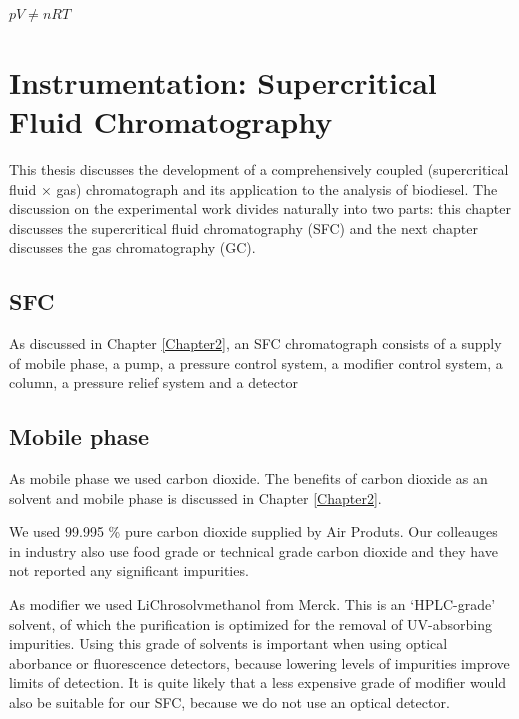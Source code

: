 
\begin{savequote}[45mm]
$pV \neq nRT$ 
\end{savequote}

\chapter{Instrumentation: Supercritical Fluid Chromatography} %

\label{Chapter4} %

This thesis discusses the development of a comprehensively coupled
(supercritical fluid × gas) chromatograph and its application to the analysis of
biodiesel. The discussion on the experimental work divides naturally into two
parts: this chapter discusses the supercritical fluid chromatography (SFC) and
the next chapter discusses the gas chromatography (GC).

\section{SFC}

As discussed in Chapter \ref{Chapter2}, an SFC chromatograph consists of a
supply of mobile phase, a pump, a pressure control system, a modifier control
system, a column, a pressure relief system and a detector

\section{Mobile phase}

As mobile phase we used carbon dioxide. The benefits of carbon dioxide as an
solvent and mobile phase is discussed in Chapter \ref{Chapter2}.

We used 99.995 \% pure carbon dioxide supplied by Air Produts. Our colleauges in
industry also use food grade or technical grade carbon dioxide and they have
not reported any significant impurities.

As modifier we used LiChrosolv\textregistered methanol from Merck. This is an
`HPLC-grade' solvent, of which the purification is optimized for the removal of
UV-absorbing impurities. Using this grade of solvents is important when using
optical aborbance or fluorescence detectors, because lowering levels of
impurities improve limits of detection. It is quite likely that a less expensive
grade of modifier would also be suitable for our SFC, because we do not use an
optical detector.

